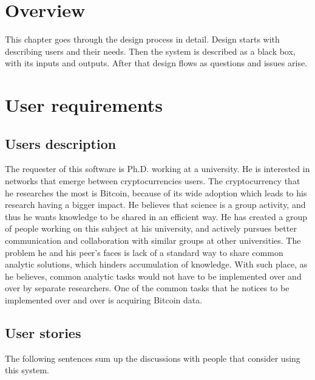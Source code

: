 \documentclass[12pt, en, eng, oneside, final]{mgr}
\begin{document}
\section{Overview}
This chapter goes through the design process in detail. Design starts with describing users and their needs. Then the system is described as a black box, with its inputs and outputs. After that design flows as questions and issues arise. 

\section{User requirements}

\subsection{Users description}

The requester of this software is Ph.D. working at a university. He is interested in networks that emerge between cryptocurrencies users. The cryptocurrency that he researches the most is Bitcoin, because of its wide adoption which leads to his research having a bigger impact. He believes that science is a group activity, and thus he wants knowledge to be shared in an efficient way. He has created a group of people working on this subject at his university, and actively pursues better communication and collaboration with similar groups at other universities. The problem he and his peer's faces is lack of a standard way to share common analytic solutions, which hinders accumulation of knowledge. With such place, as he believes, common analytic tasks would not have to be implemented over and over by separate researchers. One of the common tasks that he notices to be implemented over and over is acquiring Bitcoin data.  

\subsection{User stories}

The following sentences sum up the discussions with people that consider using this system.
\end{document}
